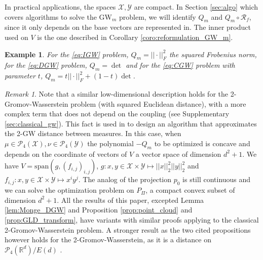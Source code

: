 \documentclass{article}
\newcommand{\R}{\mathbb{R}}
\newcommand{\Y}{\mathcal{Y}}
\newcommand{\X}{\mathcal{X}}
\newcommand{\1}{\mathbf{1}}
\newcommand{\GW}{\mathrm{GW}}
\renewcommand{\P}{\mathcal{P}}
\newtheorem{example}{Example}
\theoremstyle{definition}
\theoremstyle{remark}
\newtheorem*{remark}{Remark}
\begin{document}
In practical applications, the spaces $\X,\Y$ are compact. In Section \ref{sec:algo} which covers algorithms to solve the $\GW_m$ problem, we will identify $Q_m$ and $Q_m\circ\mathcal{R}_f$, since it only depends on the base vectors are represented in. The inner product used on $V$ is the one described in Corollary \ref{coro:reformulation_GW_m}.
\begin{example}\label{ex:3_csots_poly}
    For the \ref{eq:IGW} problem, $Q_m= ||\cdot||^2_F$ the squared Frobenius norm, for the \ref{eq:DGW} problem, $Q_m= \det$ and for the \ref{eq:CGW} problem with parameter $t$, $Q_m= t||\cdot||^2_F+ (1-t)\det$.
\end{example}

\begin{remark}
    Note that a similar low-dimensional description holds for the 2-Gromov-Wasserstein problem (with squared Euclidean distance), with a more complex term that does not depend on the coupling (see Supplementary \ref{sec:classical_gw}). This fact is used in \cite{ryner2023globally} to design an algorithm that approximates the 2-$\GW$ distance between measures. In this case, when $\mu\in \P_4(\X), \nu\in \P_4(\Y)$ the polynomial $-Q_m$ to be optimized is concave and depends on the coordinate of vectors of $V$ a vector space of dimension $d^2+1$. We have $V=\mathrm{span}(g, (f_{i,j})_{i,j})$, $g:x,y\in \X\times\Y\mapsto ||x||^2_2||y||^2_2$ and $f_{i,j}:x,y\in \X\times\Y\mapsto x^iy^j$. The analog of the projection $p_0$ is still continuous and we can solve the optimization problem on $P_\Pi$, a compact convex subset of dimension $d^2+1$. All the results of this paper, excepted Lemma \ref{lem:Monge_DGW} and Proposition \ref{prop:point_cloud} and \ref{prop:GLD_transform}, have variants with similar proofs applying to the classical 2-Gromov-Wasserstein problem. A stronger result as the two cited propositions however holds for the 2-Gromov-Wasserstein, as it is a distance on $\P_4(\R^d)/E(d)$ \cite[Theorem 5.1]{memoli2011gromov}.
\end{remark}
\end{document}
